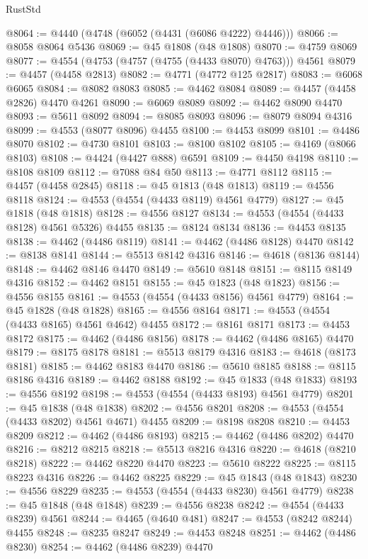 \begin{lexlean}{RustStd}
\begin{coremodule}
@8064 := @4440 (@4748 (@6052 (@4431 (@6086 @4222) @4446)))
@8066 := @8058 @8064 @5436
@8069 := @45 @1808 (@48 @1808)
@8070 := @4759 @8069
@8077 := @4554 (@4753 (@4757 (@4755 (@4433 @8070) @4763))) @4561
@8079 := @4457 (@4458 @2813)
@8082 := @4771 (@4772 @125 @2817)
@8083 := @6068 @6065
@8084 := @8082 @8083
@8085 := @4462 @8084
@8089 := @4457 (@4458 @2826) @4470 @4261
@8090 := @6069 @8089
@8092 := @4462 @8090 @4470
@8093 := @5611 @8092
@8094 := @8085 @8093
@8096 := @8079 @8094 @4316
@8099 := @4553 (@8077 @8096) @4455
@8100 := @4453 @8099
@8101 := @4486 @8070
@8102 := @4730 @8101
@8103 := @8100 @8102
@8105 := @4169 (@8066 @8103)
@8108 := @4424 (@4427 @888) @6591
@8109 := @4450 @4198
@8110 := @8108 @8109
@8112 := @7088 @84 @50
@8113 := @4771 @8112
@8115 := @4457 (@4458 @2845)
@8118 := @45 @1813 (@48 @1813)
@8119 := @4556 @8118
@8124 := @4553 (@4554 (@4433 @8119) @4561 @4779)
@8127 := @45 @1818 (@48 @1818)
@8128 := @4556 @8127
@8134 := @4553 (@4554 (@4433 @8128) @4561 @5326) @4455
@8135 := @8124 @8134
@8136 := @4453 @8135
@8138 := @4462 (@4486 @8119)
@8141 := @4462 (@4486 @8128) @4470
@8142 := @8138 @8141
@8144 := @5513 @8142 @4316
@8146 := @4618 (@8136 @8144)
@8148 := @4462 @8146 @4470
@8149 := @5610 @8148
@8151 := @8115 @8149 @4316
@8152 := @4462 @8151
@8155 := @45 @1823 (@48 @1823)
@8156 := @4556 @8155
@8161 := @4553 (@4554 (@4433 @8156) @4561 @4779)
@8164 := @45 @1828 (@48 @1828)
@8165 := @4556 @8164
@8171 := @4553 (@4554 (@4433 @8165) @4561 @4642) @4455
@8172 := @8161 @8171
@8173 := @4453 @8172
@8175 := @4462 (@4486 @8156)
@8178 := @4462 (@4486 @8165) @4470
@8179 := @8175 @8178
@8181 := @5513 @8179 @4316
@8183 := @4618 (@8173 @8181)
@8185 := @4462 @8183 @4470
@8186 := @5610 @8185
@8188 := @8115 @8186 @4316
@8189 := @4462 @8188
@8192 := @45 @1833 (@48 @1833)
@8193 := @4556 @8192
@8198 := @4553 (@4554 (@4433 @8193) @4561 @4779)
@8201 := @45 @1838 (@48 @1838)
@8202 := @4556 @8201
@8208 := @4553 (@4554 (@4433 @8202) @4561 @4671) @4455
@8209 := @8198 @8208
@8210 := @4453 @8209
@8212 := @4462 (@4486 @8193)
@8215 := @4462 (@4486 @8202) @4470
@8216 := @8212 @8215
@8218 := @5513 @8216 @4316
@8220 := @4618 (@8210 @8218)
@8222 := @4462 @8220 @4470
@8223 := @5610 @8222
@8225 := @8115 @8223 @4316
@8226 := @4462 @8225
@8229 := @45 @1843 (@48 @1843)
@8230 := @4556 @8229
@8235 := @4553 (@4554 (@4433 @8230) @4561 @4779)
@8238 := @45 @1848 (@48 @1848)
@8239 := @4556 @8238
@8242 := @4554 (@4433 @8239) @4561
@8244 := @4465 (@4640 @481)
@8247 := @4553 (@8242 @8244) @4455
@8248 := @8235 @8247
@8249 := @4453 @8248
@8251 := @4462 (@4486 @8230)
@8254 := @4462 (@4486 @8239) @4470

\end{coremodule}
\end{lexlean}
